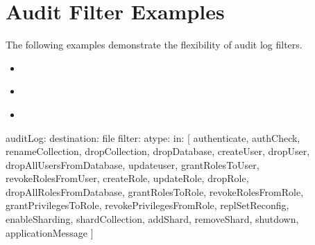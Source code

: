 \documentclass[letterpaper,10pt,english]{sphinxmanual}
\begin{document}
\section{Audit Filter Examples}
\label{\detokenize{audit-logging:audit-filter-examples}}\label{\detokenize{audit-logging:id1}}
\sphinxAtStartPar
The following examples demonstrate the flexibility of audit log filters.

\begin{sphinxShadowBox}
\begin{itemize}
\item {} 
\sphinxAtStartPar
{}\label{\detokenize{audit-logging:id2}}{\hyperref[\detokenize{audit-logging:standard-query-selectors}]{}}

\item {} 
\sphinxAtStartPar
{}\label{\detokenize{audit-logging:id3}}{\hyperref[\detokenize{audit-logging:regular-expressions}]{}}

\item {} 
\sphinxAtStartPar
{}\label{\detokenize{audit-logging:id4}}{\hyperref[\detokenize{audit-logging:read-and-write-operations}]{}}

\end{itemize}
\end{sphinxShadowBox}

\begin{sphinxVerbatim}[commandchars=\\\{\}]
auditLog:
   destination: file
      filter: \PYGZsq{}\PYGZob{}atype: \PYGZob{}\PYGZdl{}in: [
         \PYGZdq{}authenticate\PYGZdq{}, \PYGZdq{}authCheck\PYGZdq{},
         \PYGZdq{}renameCollection\PYGZdq{}, \PYGZdq{}dropCollection\PYGZdq{}, \PYGZdq{}dropDatabase\PYGZdq{},
         \PYGZdq{}createUser\PYGZdq{}, \PYGZdq{}dropUser\PYGZdq{}, \PYGZdq{}dropAllUsersFromDatabase\PYGZdq{}, \PYGZdq{}updateuser\PYGZdq{},
         \PYGZdq{}grantRolesToUser\PYGZdq{}, \PYGZdq{}revokeRolesFromUser\PYGZdq{}, \PYGZdq{}createRole\PYGZdq{}, \PYGZdq{}updateRole\PYGZdq{},
         \PYGZdq{}dropRole\PYGZdq{}, \PYGZdq{}dropAllRolesFromDatabase\PYGZdq{}, \PYGZdq{}grantRolesToRole\PYGZdq{}, \PYGZdq{}revokeRolesFromRole\PYGZdq{},
         \PYGZdq{}grantPrivilegesToRole\PYGZdq{}, \PYGZdq{}revokePrivilegesFromRole\PYGZdq{},
         \PYGZdq{}replSetReconfig\PYGZdq{},
         \PYGZdq{}enableSharding\PYGZdq{}, \PYGZdq{}shardCollection\PYGZdq{}, \PYGZdq{}addShard\PYGZdq{}, \PYGZdq{}removeShard\PYGZdq{},
         \PYGZdq{}shutdown\PYGZdq{},
         \PYGZdq{}applicationMessage\PYGZdq{}
      ]\PYGZcb{}\PYGZcb{}\PYGZsq{}
\end{sphinxVerbatim}
\end{document}
